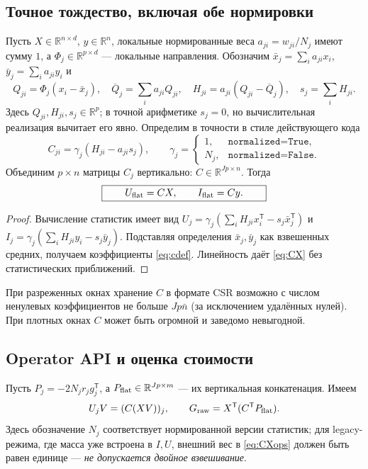 \documentclass[10.5pt,a4paper]{article}
\newcommand{\R}{\mathbb{R}}
\newcommand{\T}{^{\mathsf T}}
\numberwithin{equation}{section}
\theoremstyle{plain}
\theoremstyle{definition}
\begin{document}
\subsection{Точное тождество, включая обе нормировки}
Пусть $X\in\R^{n\times d}$, $y\in\R^n$, локальные нормированные веса $a_{ji}=w_{ji}/N_j$ имеют сумму $1$, а $\Phi_j\in\R^{p\times d}$ --- локальные направления. Обозначим $\bar x_j=\sum_i a_{ji}x_i$, $\bar y_j=\sum_i a_{ji}y_i$ и
\begin{equation}
 Q_{ji}=\Phi_j(x_i-\bar x_j),\quad
 \overline Q_j=\sum_i a_{ji}Q_{ji},\quad
 H_{ji}=a_{ji}(Q_{ji}-\overline Q_j),\quad s_j=\sum_iH_{ji}.
 \label{eq:cweights}
\end{equation}
Здесь $Q_{ji},H_{ji},s_j\in\R^p$; в точной арифметике $s_j=0$, но вычислительная реализация вычитает его явно. Определим в точности в стиле действующего кода
\begin{equation}
 C_{ji}=\gamma_j(H_{ji}-a_{ji}s_j),\qquad
 \gamma_j=\begin{cases}1,&\texttt{normalized=True},\\N_j,&\texttt{normalized=False}.\end{cases}
 \label{eq:cdef}
\end{equation}
Объединим $p\times n$ матрицы $C_j$ вертикально: $C\in\R^{Jp\times n}$. Тогда
\begin{equation}
 \boxed{\qquad U_{\rm flat}=CX,\qquad I_{\rm flat}=Cy.\qquad}
 \label{eq:CX}
\end{equation}
\begin{proof}
Вычисление статистик имеет вид $U_j=\gamma_j(\sum_i H_{ji}x_i\T-s_j\bar x_j\T)$ и $I_j=\gamma_j(\sum_iH_{ji}y_i-s_j\bar y_j)$. Подставляя определения $\bar x_j,\bar y_j$ как взвешенных средних, получаем коэффициенты \eqref{eq:cdef}. Линейность даёт \eqref{eq:CX} без статистических приближений.
\end{proof}
При разреженных окнах хранение $C$ в формате CSR возможно с числом ненулевых коэффициентов не больше $Jp\bar n$ (за исключением удалённых нулей). При плотных окнах $C$ может быть огромной и заведомо невыгодной.

\subsection{Operator API и оценка стоимости}
Пусть $P_j=-2N_jr_jg_j\T$, а $P_{\rm flat}\in\R^{Jp\times m}$ --- их вертикальная конкатенация. Имеем
\begin{equation}
 U_jV=(C(XV))_j,\qquad
 G_{\rm raw}=X\T(C\T P_{\rm flat}).
 \label{eq:CXops}
\end{equation}
Здесь обозначение $N_j$ соответствует нормированной версии статистик; для legacy-режима, где масса уже встроена в $I,U$, внешний вес в \eqref{eq:CXops} должен быть равен единице --- \emph{не допускается двойное взвешивание}.
\end{document}
